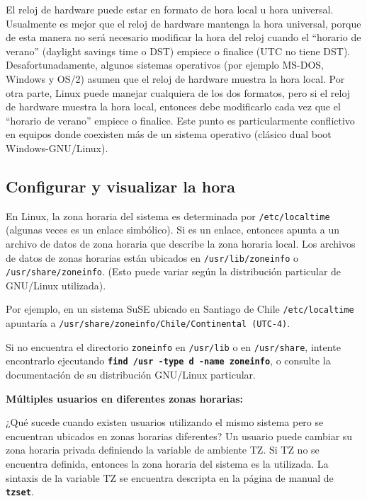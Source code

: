 \documentclass[12pt]{article}
\begin{document}
El reloj de hardware puede estar en formato de hora local u hora universal.
Usualmente es mejor que el reloj de hardware mantenga la hora universal,
porque de esta manera no será necesario modificar la hora del reloj cuando el ``horario de verano''
(daylight savings time o DST) empiece o finalice (UTC no tiene DST). Desafortunadamente, algunos sistemas operativos 
(por ejemplo MS-DOS, Windows y OS/2) asumen que el reloj de hardware muestra la hora local.
Por otra parte, Linux puede manejar cualquiera de los dos formatos, pero si el reloj de hardware muestra la hora local,
entonces debe modificarlo cada vez que el ``horario de verano'' empiece o finalice. Este 
punto es particularmente conflictivo en equipos donde coexisten más de un 
sistema operativo (clásico dual boot Windows-GNU/Linux). 


\subsection*{Configurar y visualizar la hora}

En Linux, la zona horaria del sistema es determinada por \texttt{/etc/localtime} (algunas veces
es un enlace simbólico). Si es un enlace, entonces apunta a un archivo de datos de zona horaria
que describe la zona horaria local. Los archivos de datos de zonas horarias están ubicados en
\texttt{/usr/lib/zoneinfo} o \texttt{/usr/share/zoneinfo}. (Esto puede variar según la 
distribución particular de GNU/Linux utilizada). 

Por ejemplo, en un sistema SuSE ubicado en Santiago de Chile \texttt{/etc/localtime} apuntaría
a \texttt{/usr/share/zoneinfo/Chile/Continental (UTC-4)}.

Si no encuentra el directorio \texttt{zoneinfo} en \texttt{/usr/lib} o en \texttt{/usr/share}, 
intente encontrarlo ejecutando \texttt{\textbf{find /usr -type d -name zoneinfo}}, o consulte 
la documentación de su distribución GNU/Linux particular.

\textbf{Múltiples usuarios en diferentes zonas horarias:}

¿Qué sucede cuando existen usuarios utilizando el mismo sistema pero se encuentran ubicados en
zonas horarias diferentes?
Un usuario puede cambiar su zona horaria privada definiendo la variable de ambiente TZ.
Si TZ no se encuentra definida, entonces la zona horaria del sistema es la utilizada.
La sintaxis de la variable TZ se encuentra descripta en la página de manual de \texttt{\textbf{tzset}}.
\end{document}
